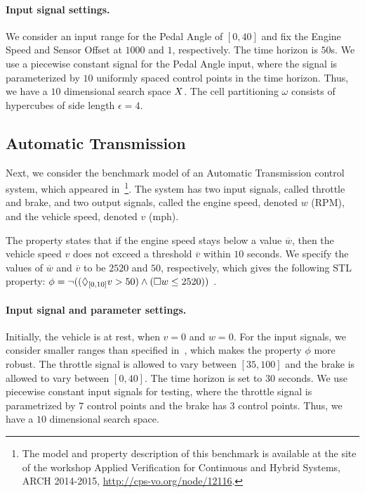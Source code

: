 \paragraph{Input signal settings.}
We consider an input range for
the Pedal Angle of $[0,40]$ and fix the Engine Speed and
Sensor Offset at $1000$ and $1$, respectively. The time horizon is $50$s.  We use  a piecewise constant
signal for the Pedal Angle input, where the signal is parameterized by $10$
uniformly spaced control points in the time horizon.  Thus, we
have a $10$ dimensional search space $X$. %
The cell partitioning $\omega$
consists of hypercubes of side length $\epsilon=4$. 


\subsection{Automatic Transmission} \label{sec:autotrans}
Next, we consider the benchmark model of an Automatic Transmission control
system, which appeared in~\cite{DBLP:conf/cpsweek/HoxhaAF14}\footnote{The model
and property description of this benchmark is available at the site of
the workshop Applied Verification for Continuous and Hybrid Systems,
ARCH 2014-2015, \url{http://cps-vo.org/node/12116}.}.  The system has
two input signals, called throttle and brake, and two
output signals, called the engine speed, denoted $w$ (RPM), and the vehicle
speed, denoted $v$ (mph).%

The property states that if the engine speed stays below a value
$\overline{w}$, then the vehicle speed $v$ does not exceed a threshold
$\overline{v}$ within $10$ seconds.  We specify the values of $\overline{w}$ and
$\overline{v}$ to be $2520$ and $50$, respectively, which gives the
following STL property: $\phi=\neg ((\Diamond_{[0,10]}v>50)\wedge(\Box w\leq
2520) )$ \cite{DBLP:conf/cpsweek/HoxhaAF14}.

\paragraph{Input signal and parameter settings.}
Initially, the vehicle is at rest, when $v=0$ and $w=0$.  For the
input signals, we consider smaller ranges than specified
in~\cite{DBLP:conf/cpsweek/HoxhaAF14}, which makes the property $\phi$ more
robust.  The throttle signal is allowed to vary between
$[35,100]$ and the brake is allowed to vary between $[0,40]$.  The
time horizon is set to $30$ seconds.  We use piecewise constant input
signals for testing, where the throttle signal is parametrized by $7$
control points and the brake has $3$ control points. Thus, we have a
$10$ dimensional search space.

